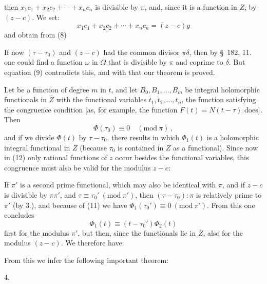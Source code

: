 then $x_1c_1 + x_2c_2 + \cdots + x_nc_n$ is divisible by $\pi$, and, since it is a
function in $Z$, by $(z - c)$. We set:
\[
x_1c_1 + x_2c_2 + \cdots + x_nc_n = (z - c)y
\]
and obtain from (8)

If now $(\tau - \tau_0)$ and $(z - c)$ had the common divisor
$\pi\delta$, then by \S\ 182, 11. one could find a function $\omega$ in $\Omega$ that is
divisible by $\pi$ and coprime to $\delta$. But equation (9) contradicts
this, and with that our theorem is proved.

Let
be a function of degree $m$ in $t$, and let $B_0, B_1, \ldots, B_m$ be integral
holomorphic functionals in $\overline{Z}$ with the functional variables $t_1,
t_2, \ldots, t_n$, the function satisfying the congruence condition
[as, for example, the function $F(t) = N(t - \tau)$ does]. Then
\[
\Phi(\tau_0) \equiv 0 \quad (\mathrm{mod}\ \pi)\,,
\]
and if we divide $\Phi(t)$ by $\tau - \tau_0$, there results
in which $\Phi_1(t)$ is a holomorphic integral functional in $\overline{Z}$ (because
$\tau_0$ is contained in $\overline{Z}$ as a  functional). Since now in (12)
only rational functions of $z$ occur besides the functional variables,
this congruence must also be valid for the modulus $z - c$:

If $\pi'$ is a second prime functional, which may also be identical
with $\pi$, and if $z - c$ is divisible by $\pi\pi'$, and $\tau \equiv \tau_0' \ (\mathrm{mod}\ \pi')$,
then $(\tau - \tau_0)\!: \pi$ is relatively prime to $\pi'$ (by 3.), and because of (11)
we have $\Phi_1(\tau_0') \equiv 0 \ (\mathrm{mod}\ \pi')$. From this one concludes
\[
\Phi_1(t) \equiv (t - \tau_0')\Phi_2(t)
\]
first for the modulus $\pi'$, but then, since the functionals
lie in $\overline{Z}$, also for the modulus $(z - c)$. We therefore have:

From this we infer the following important theorem:

4. 
